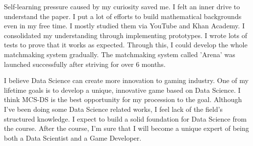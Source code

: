 \documentclass[11pt]{article}
\begin{document}
Self-learning pressure caused by my curiosity saved me.
I felt an inner drive to understand the paper.
I put a lot of efforts to build mathematical backgrounds even in my free time.
I mostly studied them via YouTube and Khan Academy.
I consolidated my understanding through implementing prototypes.
I wrote lots of tests to prove that it works as expected.
Through this, I could develop the whole matchmaking system gradually.
The matchmaking system called 'Arena' was launched successfully after striving for over 6 months. 

I believe Data Science can create more innovation to gaming industry.
One of my lifetime goals is to develop a unique, innovative game based on Data Science.
I think MCS-DS is the best opportunity for my procession to the goal.
Although I've been doing some Data Science related works, I feel lack of the field's structured knowledge.
I expect to build a solid foundation for Data Science from the course.
After the course, I'm sure that I will become a unique expert of being both a Data Scientist and a Game Developer.
\end{document}
